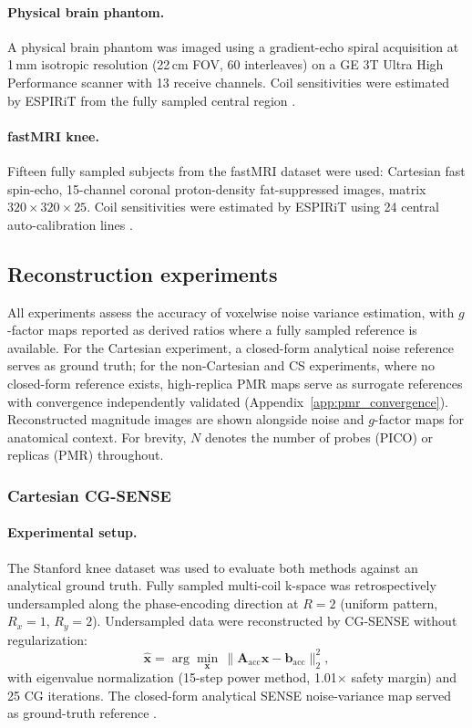 \documentclass[AMA,STIX2COL,Linenumberson]{MRM}
\begin{document}
\paragraph{Physical brain phantom.}
A physical brain phantom was imaged using a gradient-echo spiral acquisition at 1\,mm isotropic resolution (22\,cm FOV, 60 interleaves) on a GE 3T Ultra High Performance scanner with 13 receive channels. Coil sensitivities were estimated by ESPIRiT from the fully sampled central region \cite{Uecker2014}.

\paragraph{fastMRI knee.}
Fifteen fully sampled subjects from the fastMRI dataset \cite{fastmri} were used: Cartesian fast spin-echo, 15-channel coronal proton-density fat-suppressed images, matrix $320 \times 320 \times 25$. Coil sensitivities were estimated by ESPIRiT using 24 central auto-calibration lines \cite{Uecker2014}.

\subsection{Reconstruction experiments}

All experiments assess the accuracy of voxelwise noise variance estimation, with $g$-factor maps reported as derived ratios where a fully sampled reference is available. For the Cartesian experiment, a closed-form analytical noise reference serves as ground truth; for the non-Cartesian and CS experiments, where no closed-form reference exists, high-replica PMR maps serve as surrogate references with convergence independently validated (Appendix~\ref{app:pmr_convergence}). Reconstructed magnitude images are shown alongside noise and $g$-factor maps for anatomical context. For brevity, $N$ denotes the number of probes (PICO) or replicas (PMR) throughout.

\subsubsection{Cartesian CG-SENSE}

\paragraph{Experimental setup.}
The Stanford knee dataset was used to evaluate both methods against an analytical ground truth. Fully sampled multi-coil k-space was retrospectively undersampled along the phase-encoding direction at $R=2$ (uniform pattern, $R_x=1$, $R_y=2$). Undersampled data were reconstructed by CG-SENSE without regularization:
\[
\hat{\mathbf{x}} = \arg\min_{\mathbf{x}} \,\|\mathbf{A}_{\mathrm{acc}} \mathbf{x} - \mathbf{b}_{\mathrm{acc}}\|_2^2,
\]
with eigenvalue normalization (15-step power method, 1.01$\times$ safety margin) and 25 CG iterations. The closed-form analytical SENSE noise-variance map served as ground-truth reference \cite{sense}.
\end{document}
